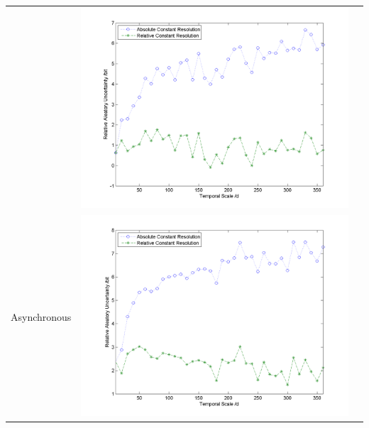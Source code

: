 \documentclass[11pt]{article}
\begin{document}
\begin{table}[H]
{\begin{tabular}{ccc}
&\begin{minipage}{.6\textwidth}\includegraphics[width=\linewidth]{resultgraph/06810000AU.png}\end{minipage}
\\
Asynchronous
&\begin{minipage}{.6\textwidth}\includegraphics[width=\linewidth]{resultgraph/02143000AU.png}\end{minipage}
 

\end{tabular}}
\end{table}
\end{document}
